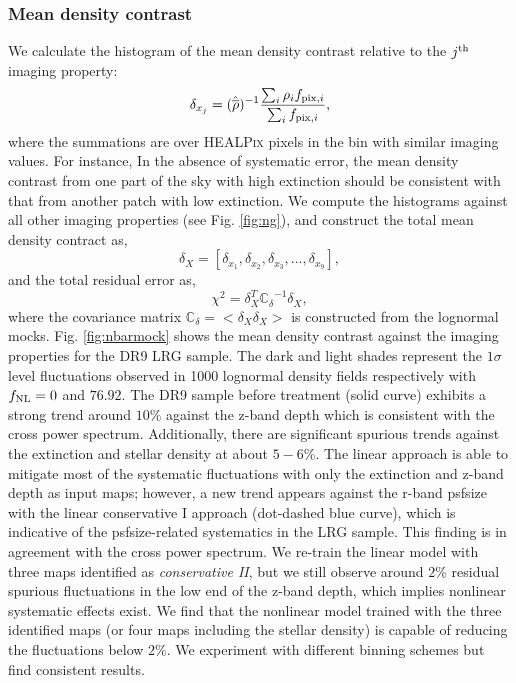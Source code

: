 \subsubsection{Mean density contrast}
We calculate the histogram of the mean density contrast relative to the $j^{\rm th}$ imaging property:
\begin{equation}
\delta_{x_{j}} = ({\hat{\overline{\rho}}})^{-1} \frac{\sum_{i} \rho_{i} f_{{\rm pix}, i}}{\sum_{i} f_{{\rm pix}, i}},
\end{equation}
where the summations are over \textsc{HEALPix} pixels in the bin with similar imaging values. For instance, In the absence of systematic error, the mean density contrast from one part of the sky with high extinction should be consistent with that from another patch with low extinction. We compute the histograms against all other imaging properties (see Fig. \ref{fig:ng}), and construct the total mean density contract as,
\begin{equation}
\delta_{X} = [\delta_{x_{1}}, \delta_{x_{2}}, \delta_{x_{3}}, ..., \delta_{x_{9}}],
\end{equation}
and the total residual error as,
\begin{equation}
\chi^{2} = \delta_{X}^{T} \mathbb{C_{\delta}}^{-1} \delta_{X},
\end{equation}
where the covariance matrix $\mathbb{C}_{\delta} = < \delta_{X} \delta_{X}>$ is constructed from the lognormal mocks. Fig. \ref{fig:nbarmock} shows the mean density contrast against the imaging properties for the DR9 LRG sample. The dark and light shades represent the $1\sigma$ level fluctuations observed in 1000 lognormal density fields respectively with $f_{\rm NL}=0$ and $76.92$. The DR9 sample before treatment (solid curve) exhibits a strong trend around $10\%$ against the z-band depth which is consistent with the cross power spectrum. Additionally, there are significant spurious trends against the extinction and stellar density at about $5-6\%$. The linear approach is able to mitigate most of the systematic fluctuations with only the extinction and z-band depth as input maps; however,  a new trend appears against the r-band psfsize with the linear conservative I approach (dot-dashed blue curve), which is indicative of the psfsize-related systematics in the LRG sample. This finding is in agreement with the cross power spectrum. We re-train the linear model with three maps identified as \textit{conservative II}, but we still observe around $2\%$ residual spurious fluctuations in the low end of the z-band depth, which implies nonlinear systematic effects exist. We find that the nonlinear model trained with the three identified maps (or four maps including the stellar density) is capable of reducing the fluctuations below $2\%$. We experiment with different binning schemes but find consistent results.


